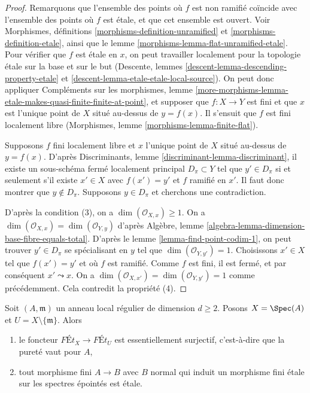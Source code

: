 \begin{proof}
Remarquons que l'ensemble des points où $f$ est non ramifié coïncide avec
l'ensemble des points où $f$ est étale, et que cet ensemble est ouvert.
Voir Morphismes, définitions \ref{morphisms-definition-unramified}
et \ref{morphisms-definition-etale}, ainsi que le
lemme \ref{morphisms-lemma-flat-unramified-etale}.
Pour vérifier que $f$ est étale en $x$, on peut travailler localement pour la topologie étale
sur la base et sur le
but (Descente, lemmes \ref{descent-lemma-descending-property-etale} et
\ref{descent-lemma-etale-etale-local-source}).
On peut donc appliquer Compléments sur les morphismes, lemme
\ref{more-morphisms-lemma-etale-makes-quasi-finite-finite-at-point},
et supposer que $f : X \to Y$ est fini et que $x$ est l'unique
point de $X$ situé au-dessus de $y = f(x)$.
Il s'ensuit que $f$ est fini localement libre
(Morphismes, lemme \ref{morphisms-lemma-finite-flat}).

\medskip\noindent
Supposons $f$ fini localement libre et $x$ l'unique point de
$X$ situé au-dessus de $y = f(x)$. D'après
Discriminants, lemme \ref{discriminant-lemma-discriminant},
il existe un sous-schéma fermé localement principal $D_\pi \subset Y$
tel que $y' \in D_\pi$ si et seulement s'il existe $x' \in X$
avec $f(x') = y'$ et $f$ ramifié en $x'$. Il faut donc montrer
que $y \not \in D_\pi$. Supposons $y \in D_\pi$ et cherchons une contradiction.

\medskip\noindent
D'après la condition (3), on a $\dim(\mathcal{O}_{X, x}) \geq 1$.
On a $\dim(\mathcal{O}_{X, x}) = \dim(\mathcal{O}_{Y, y})$ d'après
Algèbre, lemme \ref{algebra-lemma-dimension-base-fibre-equals-total}.
D'après le lemme \ref{lemma-find-point-codim-1},
on peut trouver $y' \in D_\pi$ se spécialisant en $y$
tel que $\dim(\mathcal{O}_{Y, y'}) = 1$.
Choisissons $x' \in X$ tel que $f(x') = y'$ et où $f$ est ramifié. Comme $f$
est fini, il est fermé, et par conséquent $x' \leadsto x$.
On a $\dim(\mathcal{O}_{X, x'}) = \dim(\mathcal{O}_{Y, y'}) = 1$
comme précédemment. Cela contredit la propriété (4).
\end{proof}

\begin{lemma}
\label{lemma-local-purity}
Soit $(A, \mathfrak m)$ un anneau local régulier de dimension $d \geq 2$.
Posons $X = \Spec(A)$ et $U = X \setminus \{\mathfrak m\}$. Alors
\begin{enumerate}
\item le foncteur $\textit{F\'Et}_X \to \textit{F\'Et}_U$
est essentiellement surjectif, c'est-à-dire que la pureté vaut pour $A$,
\item tout morphisme fini $A \to B$ avec $B$ normal qui
induit un morphisme fini étale sur les spectres épointés est étale.
\end{enumerate}
\end{lemma}

